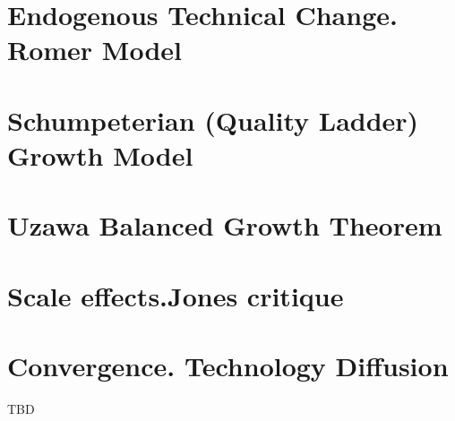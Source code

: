 \documentclass[11pt,paper,footinclude=true,headinclude=true,oneside]{scrbook} %
\begin{document}
\chapter{Endogenous Technical Change. Romer Model}

\chapter{Schumpeterian (Quality Ladder) Growth Model }

\chapter{Uzawa Balanced Growth Theorem}

\chapter{Scale effects.Jones critique}

\chapter{Convergence. Technology Diffusion}

\begin{thebibliography}{9}
TBD
\end{thebibliography}
\end{document}
